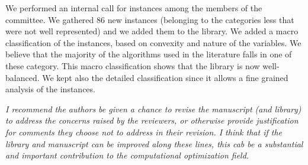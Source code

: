 \documentclass[11pt]{article}
\newcommand{\rep}[1]{{\textcolor{acblue}{#1}}}
\newcommand{\leo}[1]{{\color{red}#1}}
\begin{document}
\rep{
We performed an internal call for instances among the members of the committee. 
We gathered $86$ new instances (belonging to the categories less that were not well represented) and we added them to the library. We added a macro classification of the instances, based on convexity and nature of the variables.
We believe that the majority of the algorithms used in the literature falls in one of these category.
This macro classification shows that the library is now well-balanced.
We kept also the detailed classification since it allows a fine grained analysis of the instances.
}





{\it
I recommend the authors be given a chance to revise the manuscript (and library) to address the concerns raised by the reviewers, or otherwise provide justification for comments they choose not to address in their revision. I think that if the library and manuscript can be improved along these lines, this cab be a substantial and important contribution to the computational optimization field. 
}
\end{document}
